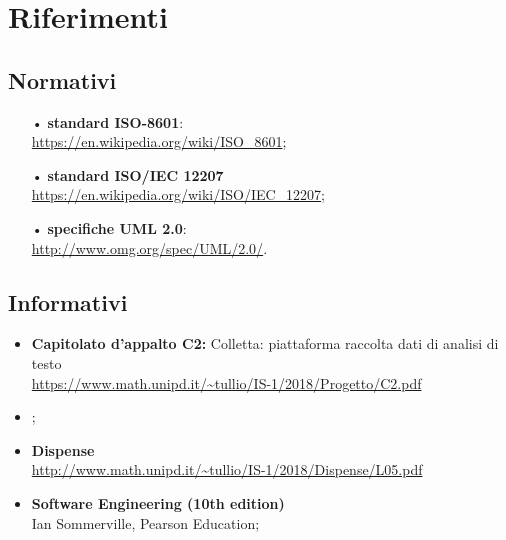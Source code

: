 \section{Riferimenti}

\subsection{Normativi}
\begin{itemize}
\item[•]\textbf{standard {ISO}-8601}:\\
\url{https://en.wikipedia.org/wiki/ISO_8601};
\item[•]\textbf{standard ISO/{IEC} 12207}\\
\url{https://en.wikipedia.org/wiki/ISO/IEC_12207};
\item[•]\textbf{specifiche {UML} 2.0}:\\
\url{http://www.omg.org/spec/UML/2.0/}.

\end{itemize} 
\subsection{Informativi}
\begin{itemize}
\item \textbf{Capitolato d’appalto C2:} Colletta: piattaforma raccolta dati di analisi di testo\\
\url{https://www.math.unipd.it/~tullio/IS-1/2018/Progetto/C2.pdf}
\item \textbf{\PdP};
\item \textbf{Dispense} \\
\url{http://www.math.unipd.it/~tullio/IS-1/2018/Dispense/L05.pdf}
\item \textbf{Software Engineering (10th edition)}\\ Ian Sommerville, Pearson Education;

\end{itemize}
